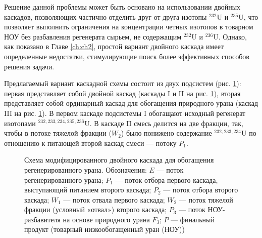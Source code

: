 Решение данной проблемы может быть основано на использовании двойных каскадов, позволяющих частично отделить друг от друга изотопы $^{232}$U и $^{235}$U, что позволяет выполнить ограничения на концентрации четных изотопов в товарном НОУ без разбавления регенерата сырьем, не содержащим $^{232}$U и $^{236}$U. Однако, как показано в Главе \ref{ch:ch2}, простой вариант двойного каскада имеет определенные недостатки, стимулирующие поиск более эффективных способов решения задачи. 

Предлагаемый вариант каскадной схемы состоит из двух подсистем (рис. \ref{p2left}): первая представляет собой двойной каскад (каскады I и II на рис. \ref{p2left}), вторая представляет собой ординарный каскад для обогащения природного урана (каскад III на рис. \ref{p2left}). В первом каскаде подсистемы I обогащают исходный регенерат изотопами $^{232,233,234,235,236}$U. В каскаде II смесь делится на две фракции, так, чтобы в потоке тяжелой фракции ($W_2$) было понижено содержание $^{232,233,234}$U по отношению к питающей второй каскад смеси --- потоку $P_1$. 

\begin{figure}[ht]
    \caption{Схема модифицированного двойного каскада для обогащения регенерированного урана. Обозначения: $E$ --- поток регенерированного урана; $P_1$ --- поток отбора первого каскада, выступающий питанием второго каскада; $P_2$ --- поток отбора второго каскада; $W_1$ --- поток отвала первого каскада; $W_2$ --- поток тяжелой фракции (условный «отвал») второго каскада; $P_3$ --- поток НОУ-разбавителя  на основе природного урана $F_3$; $P$ --- финальный продукт (товарный низкообогащенный уран (НОУ))}\label{p2left}
\end{figure}

